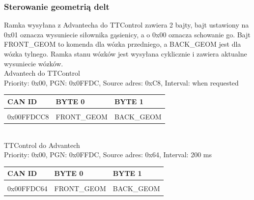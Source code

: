 \documentclass{article}
\begin{document}
\subsubsection{Sterowanie geometrią delt}
Ramka wysyłana z Advantecha do TTControl zawiera 2 bajty, bajt ustawiony na 0x01 oznacza wysuniecie siłownika gąsienicy, a o 0x00 oznacza schowanie go. Bajt FRONT\_GEOM to komenda dla wózka przedniego, a BACK\_GEOM jest dla wózka tylnego. Ramka stanu wózków jest wysyłana cyklicznie i zawiera aktualne wysuniecie wózków.\\

Advantech do TTControl\\
Priority: 0x00, PGN: 0x0FFDC, Source adres: 0xC8, Interval: when requested \\
\begin{left}
\begin{tabular}{ |p{2cm}|p{2.5cm}|p{2.5cm}|} 
 \hline
 CAN ID & BYTE 0 & BYTE 1 \\ \hline
 & & \\
0x00FFDCC8 & FRONT\_GEOM & BACK\_GEOM \\ 
 \hline
\end{tabular}
\end{left}\\

TTControl do Advantech\\
Priority: 0x00, PGN: 0x0FFDC, Source adres: 0x64, Interval: 200 ms \\
\begin{left}
\begin{tabular}{ |p{2cm}|p{2.5cm}|p{2.5cm}|} 
 \hline
 CAN ID & BYTE 0 & BYTE 1 \\ \hline
 & & \\
0x00FFDC64 & FRONT\_GEOM & BACK\_GEOM \\ 
 \hline
\end{tabular}
\end{left}\\
\end{document}
